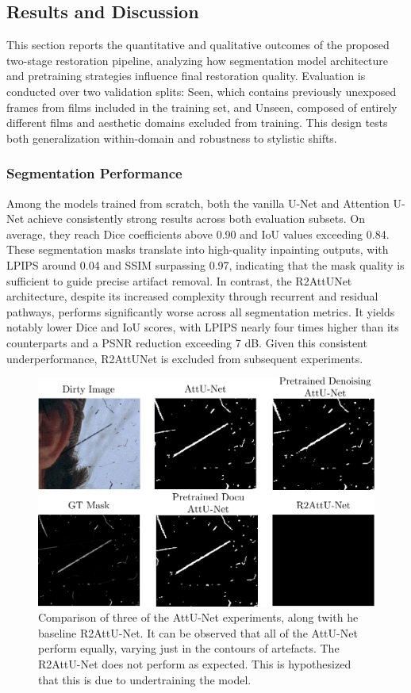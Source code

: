 \documentclass[10pt,a4paper,twocolumn,twoside]{article}
\begin{document}
\subsection{Results and Discussion}
This section reports the quantitative and qualitative outcomes of the proposed two-stage restoration pipeline, analyzing how segmentation model architecture and pretraining strategies influence final restoration quality. Evaluation is conducted over two validation splits: Seen, which contains previously unexposed frames from films included in the training set, and Unseen, composed of entirely different films and aesthetic domains excluded from training. This design tests both generalization within-domain and robustness to stylistic shifts.

\subsubsection{Segmentation Performance}
Among the models trained from scratch, both the vanilla U-Net and Attention U-Net achieve consistently strong results across both evaluation subsets. On average, they reach Dice coefficients above 0.90 and IoU values exceeding 0.84. These segmentation masks translate into high-quality inpainting outputs, with LPIPS around 0.04 and SSIM surpassing 0.97, indicating that the mask quality is sufficient to guide precise artifact removal. In contrast, the R2AttUNet architecture, despite its increased complexity through recurrent and residual pathways, performs significantly worse across all segmentation metrics. It yields notably lower Dice and IoU scores, with LPIPS nearly four times higher than its counterparts and a PSNR reduction exceeding 7 dB. Given this consistent underperformance, R2AttUNet is excluded from subsequent experiments. 
\begin{figure}[htbp]
    \centering
    \includegraphics[width=0.8\linewidth]{img/segmentation_figure.pdf}
    \caption{\small Comparison of three of the AttU-Net experiments, along twith he baseline R2AttU-Net. It can be observed that all of the AttU-Net perform equally, varying just in the contours of artefacts. The R2AttU-Net does not perform as expected. This is hypothesized that this is due to undertraining the model.}
    \label{fig:segmentation_performance}
\end{figure}
\end{document}
